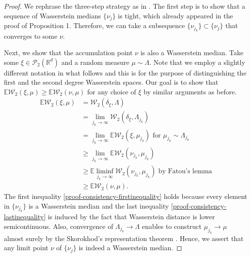 \documentclass[11pt]{article}
\newcommand{\calP}{\mathcal{P}}
\newcommand{\calW}{\mathcal{W}}
\newcommand{\bbR}{\mathbb{R}}
\newcommand{\bbE}{\mathbb{E}}
\begin{document}
\begin{proof}
	We rephrase the three-step strategy as in \cite{legouic_2017_ExistenceConsistencyWasserstein}. The first step is to show that a sequence of Wasserstein medians $\lbrace \nu_j\rbrace$ is tight, which already appeared in the proof of Proposition 1. Therefore, we can take a subsequence $\lbrace \nu_{j_k}\rbrace \subset \lbrace \nu_j \rbrace$ that converges to some $\nu$. 
	
	Next, we show that the accumulation point $\nu$ is also a Wasserstein median. Take some $\xi \in \calP_2(\bbR^d)$ and a random measure $\mu \sim \Lambda$. Note that we employ a slightly different notation in what follows and this is for the purpose of distinguishing the first and the second degree Wasserstein spaces. Our goal is to show that $\bbE \calW_2 (\xi, \mu) \geq \bbE \calW_2 (\nu, \mu)$ for any choice of $\xi$ by similar arguments as before. 
	\begin{align}
	\bbE	\calW_2 (\xi, \mu) &= \calW_2 (\delta_\xi, \Lambda) \nonumber\\
	&=   \lim_{j_k \rightarrow \infty} \calW_2 (\delta_\xi, \Lambda_{j_k}) \nonumber\\
	&= \lim_{j_k \rightarrow \infty} \bbE \calW_2 (\xi, \mu_{j_k})\text{ for }\mu_{j_k} \sim \Lambda_{j_k}\nonumber\\
	&\geq \lim_{j_k \rightarrow \infty} \bbE \calW_2 (\nu_{j_k}, \mu_{j_k}) \label{proof-consistency-firstinequality}\\
	&\geq \bbE \liminf_{j_k \rightarrow \infty} \calW_2 (\nu_{j_k}, \mu_{j_k})  \text{ by Fatou's lemma}\nonumber\\
	&\geq \bbE \calW_2 (\nu, \mu)\label{proof-consistency-lastinequality}.
	\end{align}
	The first inequality \eqref{proof-consistency-firstinequality} holds because every element in $\lbrace \nu_{j_k}\rbrace$ is a Wasserstein median and the last inequality \eqref{proof-consistency-lastinequality} is induced by the fact that Wasserstein distance is lower semicontinuous. Also, convergence of $\Lambda_{j_k} \rightarrow \Lambda$ enables to construct $\mu_{j_k} \rightarrow \mu$ almost surely by the Skorokhod's representation theorem  \citep{billingsley_1999_ConvergenceProbabilityMeasures}. Hence, we assert that any limit point $\nu$ of $\lbrace \nu_j \rbrace$ is indeed a Wasserstein median. 
	

\end{proof}
\end{document}
